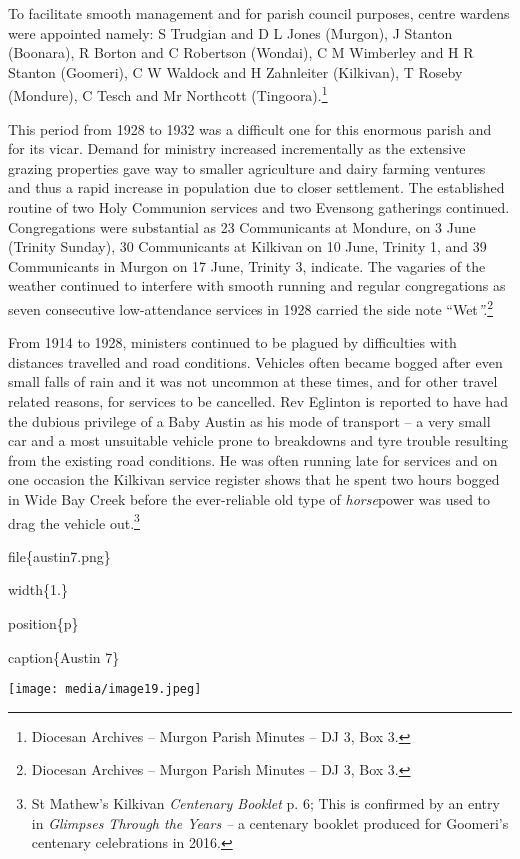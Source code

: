 To facilitate smooth management and for parish council purposes, centre wardens were appointed namely: S Trudgian and D L Jones (Murgon), J Stanton (Boonara), R Borton and C Robertson (Wondai), C M Wimberley and H R Stanton (Goomeri), C W Waldock and H Zahnleiter (Kilkivan), T Roseby (Mondure), C Tesch and Mr Northcott (Tingoora).\footnote{Diocesan Archives -- Murgon Parish Minutes -- DJ 3, Box 3.}

This period from 1928 to 1932 was a difficult one for this enormous parish and for its vicar. Demand for ministry increased incrementally as the extensive grazing properties gave way to smaller agriculture and dairy farming ventures and thus a rapid increase in population due to closer settlement. The established routine of two Holy Communion services and two Evensong gatherings continued. Congregations were substantial as 23 Communicants at Mondure, on 3 June (Trinity Sunday), 30 Communicants at Kilkivan on 10 June, Trinity 1, and 39 Communicants in Murgon on 17 June, Trinity 3, indicate. The vagaries of the weather continued to interfere with smooth running and regular congregations as seven consecutive low-attendance services in 1928 carried the side note ``Wet\emph{''.}\footnote{Diocesan Archives -- Murgon Parish Minutes -- DJ 3, Box 3.}

From 1914 to 1928, ministers continued to be plagued by difficulties with distances travelled and road conditions. Vehicles often became bogged after even small falls of rain and it was not uncommon at these times, and for other travel related reasons, for services to be cancelled. Rev Eglinton is reported to have had the dubious privilege of a Baby Austin as his mode of transport -- a very small car and a most unsuitable vehicle prone to breakdowns and tyre trouble resulting from the existing road conditions. He was often running late for services and on one occasion the Kilkivan service register shows that he spent two hours bogged in Wide Bay Creek before the ever-reliable old type of \emph{horse}power was used to drag the vehicle out.\footnote{St Mathew's Kilkivan \emph{Centenary Booklet} p. 6; This is confirmed by an entry in \emph{Glimpses Through the Years --} a centenary booklet produced for Goomeri's centenary celebrations in 2016.}

file\{austin7.png\}

width\{1.\}

position\{p\}

caption\{Austin 7\}

\texttt{[image: media/image19.jpeg]}

